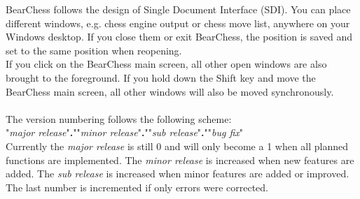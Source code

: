 \documentclass[11pt,a4paper]{article}
\begin{document}
BearChess follows the design of Single Document Interface (SDI). You can place different windows, e.g. chess engine output or chess move list, anywhere on your Windows desktop. If you close them or exit BearChess, the position is saved and set to the same position when reopening.\\ 
If you click on the BearChess main screen, all other open windows are also brought to the foreground. If you hold down the Shift key and move the BearChess main screen, all other windows will also be moved synchronously.\\\\
The version numbering follows the following scheme:\\ 
"\textit{major release}"\textbf{.}""\textit{minor release}"\textbf{.}""\textit{sub release}"\textbf{.}""\textit{bug fix}"\\
Currently the \textit{major release} is still 0 and will only become a 1 when all planned functions are implemented. The \textit{minor release} is increased when new features are added. The \textit{sub release} is increased when minor features are added or improved. The last number is incremented if only errors were corrected.
\end{document}
